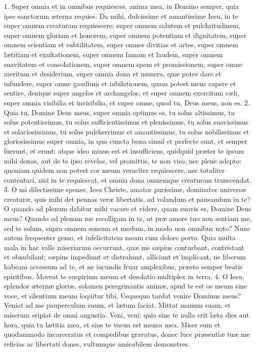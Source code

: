 \documentclass[twoside]{article}
\begin{document}
1. Super omnia et in omnibus requiesces, anima mea, in Domino semper, quia ipse sanctorum æterna requies. Da mihi, dulcissime et amantissime Iesu, in te super omnem creaturam requiescere: super omnem salutem et pulchritudinem, super omnem gloriam et honorem, super omnem potentiam et dignitatem, super omnem scientiam et subtilitatem, super omnes divitias et artes, super omnem lætitiam et exultationem, super omnem famam et laudem, super omnem suavitatem et consolationem, super omnem spem et promissionem, super omne meritum et desiderium, super omnia dona et munera, quæ potes dare et infundere, super omne gaudium et iubilationem, quam potest mens capere et sentire, denique super angelos et archangelos, et super omnem exercitum cæli, super omnia visibilia et invisibilia, et super omne, quod tu, Deus meus, non es.
2. Quia tu, Domine Deus meus, super omnia optimus es, tu solus altissimus, tu solus potentissimus, tu solus sufficientissimus et plenissimus, tu solus suavissimus et solaciosissimus, tu solus pulcherrimus et amantissimus, tu solus nobilissimus et gloriosissimus super omnia, in quo cuncta bona simul et perfecte sunt, et semper fuerunt, et erunt: atque ideo minus est et insufficiens, quidquid præter te ipsum mihi donas, aut de te ipso revelas, vel promittis, te non viso, nec plene adepto: quoniam quidem non potest cor meum veraciter requiescere, nec totaliter contentari, nisi in te requiescat, et omnia dona omnemque creaturam transcendat.
3. O mi dilectissime sponse, Iesu Christe, amator purissime, dominator universæ creaturæ, quis mihi det pennas veræ libertatis, ad volandum et pausandum in te? O quando ad plenum dabitur mihi vacare et videre, quam suavis es, Domine Deus meus? Quando ad plenum me recolligam in te, ut præ amore tuo non sentiam me, sed te solum, supra omnem sensum et modum, in modo non omnibus noto? Nunc autem frequenter gemo, et infelicitatem meam cum dolore porto. Quia multa mala in hac valle miseriarum occurrunt, quæ me sæpius conturbant, contristant et obnubilant; sæpius impediunt et distrahunt, alliciunt et implicant, ne liberum habeam accessum ad te, et ne iucundis fruar amplexibus, præsto semper beatis spiritibus. Moveat te suspirium meum et desolatio multiplex in terra.
4. O Iesu, splendor æternæ gloriæ, solamen peregrinantis animæ, apud te est os meum sine voce, et silentium meum loquitur tibi. Usquequo tardat venire Dominus meus? Veniat ad me pauperculum suum, et lætum faciat. Mittat manum suam, et miserum eripiat de omni angustia. Veni, veni: quia sine te nulla erit læta dies aut hora, quia tu lætitia mea, et sine te vacua est mensa mea. Miser sum et quodammodo incarceratus et compedibus gravatus, donec luce præsentiæ tuæ me reficias ac libertati dones, vultumque amicabilem demonstres.
\end{document}

